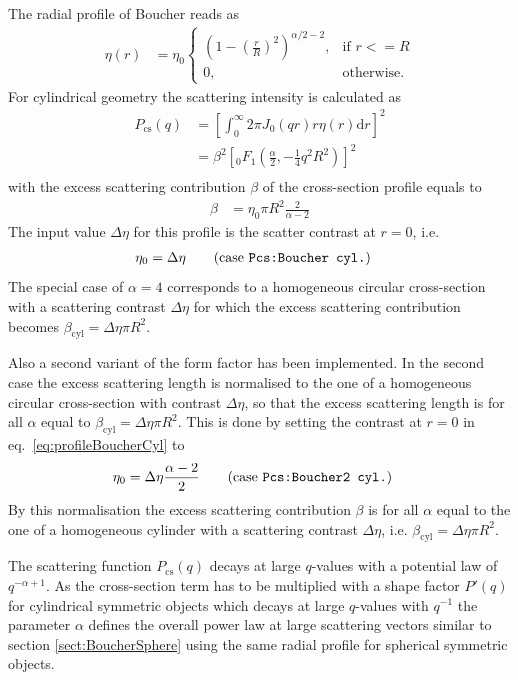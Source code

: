 The radial profile of Boucher \cite{Boucher1983} reads as
\begin{align}
\eta(r) &= \eta_0
  \begin{cases}
    \left(1-\left(\frac{r}{R}\right)^2\right)^{\alpha/2-2}, & \mbox{if } r<=R \\
    0, & \mbox{otherwise}.
  \end{cases}
\end{align}
For cylindrical geometry the scattering intensity is calculated as
\begin{align}\label{eq:Pcs_cylBoucher}
  P_\mathrm{cs}(q)&= \left[\int_0^\infty 2\pi J_0(qr)r \eta(r) \mathrm{d}r\right]^2 \nonumber \\
                  &= \beta^2 \left[ {}_0F_1\left(\frac{\alpha}{2},-\frac14q^2R^2\right)\right]^2 \\
\end{align}
with the excess scattering contribution $\beta$ of the cross-section profile equals to
\begin{align}\label{eq:beta_cyl_boucher}
  \beta & = \eta_0\pi R^2 \frac{2}{\alpha-2}
\end{align}
The input value $\Delta\eta$ for this profile is the scatter contrast at $r=0$, i.e.
\begin{align}
\eta_0&=\Delta\eta \qquad \mbox{(case \texttt{Pcs:Boucher cyl.})}
\label{eq:eta0BoucherCyl}
\end{align}
The special case of $\alpha=4$ corresponds to a homogeneous circular cross-section with a scattering contrast $\Delta\eta$ for which the excess scattering contribution becomes $\beta_\mathrm{cyl}=\Delta\eta \pi R^2$.

 Also a second variant of the form factor has been implemented. In the second case the excess scattering length is normalised to the one of a homogeneous circular cross-section with contrast $\Delta\eta$, so that the excess scattering length is for all $\alpha$ equal to $\beta_\mathrm{cyl}=\Delta\eta \pi R^2$. This is done by setting the contrast at $r=0$ in eq.\ \ref{eq:profileBoucherCyl} to
\begin{align}
\eta_0&=\Delta\eta \frac{\alpha-2}{2}  \qquad \mbox{(case \texttt{Pcs:Boucher2 cyl.})}
\label{eq:eta0BoucherCyl2}
\end{align}
By this normalisation the excess scattering contribution $\beta$ is for all $\alpha$ equal to the one of a homogeneous cylinder with a scattering contrast $\Delta\eta$, i.e. $\beta_\mathrm{cyl}=\Delta\eta \pi R^2$.

 The scattering function $P_\mathrm{cs}(q)$ decays at large $q$-values with a potential law of $q^{-\alpha+1}$. As the cross-section term has to be multiplied with a shape factor $P'(q)$ for cylindrical symmetric objects which decays at large $q$-values with $q^{-1}$ the parameter $\alpha$ defines the overall power law at large scattering vectors similar to section \ref{sect:BoucherSphere} using the same radial profile for spherical symmetric objects.

